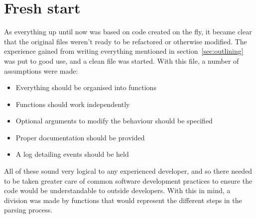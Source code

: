 \documentclass[11pt,british]{article}
\begin{document}
\section{Fresh start}
As everything up until now was based on code created on the fly, it became clear that the original files weren't ready to be refactored or otherwise modified. The experience gained from writing everything mentioned in section~\ref{sec:outlining} was put to good use, and a clean file was started. With this file, a number of assumptions were made:
\begin{itemize}
\item Everything should be organised into functions
\item Functions should work independently
\item Optional arguments to modify the behaviour should be specified
\item Proper documentation should be provided
\item A log detailing events should be held
\end{itemize}
All of these sound very logical to any experienced developer, and so there needed to be taken greater care of common software development practices to ensure the code would be understandable to outside developers. With this in mind, a division was made by functions that would represent the different steps in the parsing process.
\end{document}
